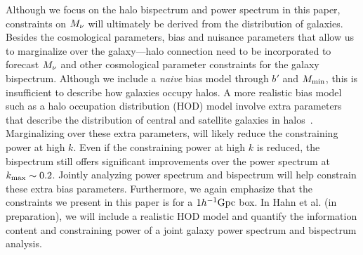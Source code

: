 Although we focus on the halo bispectrum and power spectrum in this paper, 
constraints on $M_\nu$ will ultimately be derived from the distribution of 
galaxies. Besides the cosmological parameters, bias and nuisance parameters 
that allow us to marginalize over the galaxy---halo connection need to be
incorporated to forecast $M_\nu$ and other cosmological parameter constraints 
for the galaxy bispectrum. Although we include a \emph{naive} bias model 
through $b'$ and $M_{\rm min}$, this is insufficient to describe how galaxies
occupy halos. A more realistic bias model such as a halo occupation distribution 
(HOD) model involve extra parameters that describe the distribution of central 
and satellite galaxies in halos~\citep[\emph{e.g.}][]{zheng2005,leauthaud2012a,tinker2013,zentner2016,vakili2019}. 
Marginalizing over these extra parameters, will likely reduce the constraining 
power at high $k$. Even if the constraining power at high $k$ is reduced, the
bispectrum still offers significant improvements over the power spectrum at 
$k_{\rm max} \sim 0.2$. Jointly analyzing power spectrum and bispectrum will 
help constrain these extra bias parameters. 
 Furthermore, we again emphasize that
the constraints we present in this paper is for a $1h^{-1}{\rm Gpc}$ box. In 
Hahn et al. (in preparation), we will include a realistic HOD model and quantify 
the information content and constraining power of a joint galaxy power spectrum 
and bispectrum analysis. 
